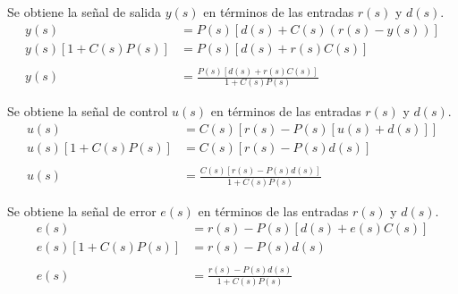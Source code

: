 \documentclass{ucrEieTarea}
\begin{document}
  Se obtiene la señal de salida $y(s)$ en términos de las entradas $r(s)$ y $d(s)$.
  \begin{align*}
    y(s) &= P(s) \left[ d(s) + C(s) \left( r(s) - y(s) \right) \right]
    \\
    y(s) \left[ 1 + C(s) P(s) \right] &= P(s) \left[ d(s) + r(s) C(s) \right]
    \\ \\
    y(s) &= \frac{P(s) \left[ d(s) + r(s) C(s) \right]}{1 + C(s) P(s)}
  \end{align*}

  Se obtiene la señal de control $u(s)$ en términos de las entradas $r(s)$ y $d(s)$.
  \begin{align*}
    u(s) &= C(s) \left[ r(s) - P(s) \left[ u(s) + d(s) \right] \right]
    \\
    u(s) \left[ 1 + C(s) P(s) \right] &= C(s) \left[ r(s) - P(s) d(s) \right]
    \\ \\
    u(s) &= \frac{C(s) \left[ r(s) - P(s) d(s) \right]}{1 + C(s) P(s)}
  \end{align*}

  Se obtiene la señal de error $e(s)$ en términos de las entradas $r(s)$ y $d(s)$.
  \begin{align*}
    e(s) &= r(s) - P(s) \left[ d(s) + e(s) C(s) \right]
    \\
    e(s) \left[ 1 + C(s) P(s) \right] &= r(s) - P(s) d(s)
    \\ \\
    e(s) &= \frac{r(s) - P(s) d(s)}{1 + C(s) P(s)}
  \end{align*}


  \begin{ejercicio}

  \end{ejercicio}

  \begin{ejercicio}

  \end{ejercicio}

  \begin{ejercicio}

  \end{ejercicio}
\end{document}
